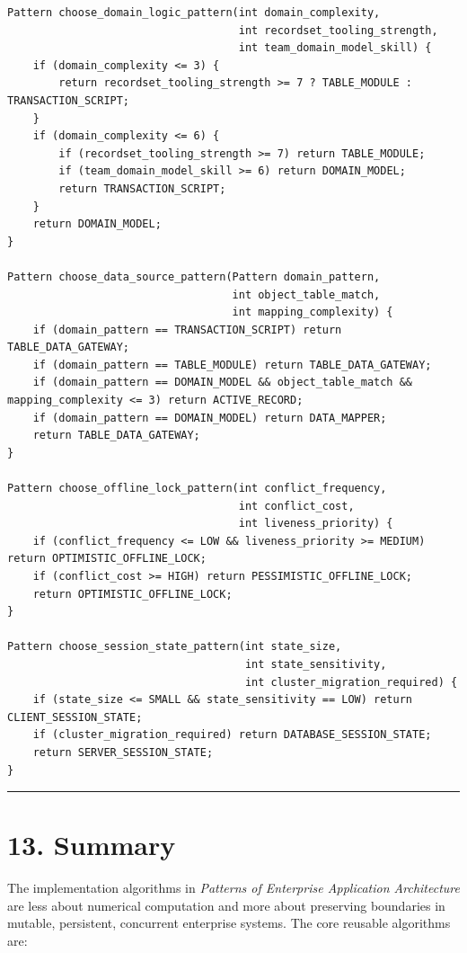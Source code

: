 \documentclass[11pt]{article}
\begin{document}
\begin{verbatim}
Pattern choose_domain_logic_pattern(int domain_complexity,
                                    int recordset_tooling_strength,
                                    int team_domain_model_skill) {
    if (domain_complexity <= 3) {
        return recordset_tooling_strength >= 7 ? TABLE_MODULE : TRANSACTION_SCRIPT;
    }
    if (domain_complexity <= 6) {
        if (recordset_tooling_strength >= 7) return TABLE_MODULE;
        if (team_domain_model_skill >= 6) return DOMAIN_MODEL;
        return TRANSACTION_SCRIPT;
    }
    return DOMAIN_MODEL;
}

Pattern choose_data_source_pattern(Pattern domain_pattern,
                                   int object_table_match,
                                   int mapping_complexity) {
    if (domain_pattern == TRANSACTION_SCRIPT) return TABLE_DATA_GATEWAY;
    if (domain_pattern == TABLE_MODULE) return TABLE_DATA_GATEWAY;
    if (domain_pattern == DOMAIN_MODEL && object_table_match && mapping_complexity <= 3) return ACTIVE_RECORD;
    if (domain_pattern == DOMAIN_MODEL) return DATA_MAPPER;
    return TABLE_DATA_GATEWAY;
}

Pattern choose_offline_lock_pattern(int conflict_frequency,
                                    int conflict_cost,
                                    int liveness_priority) {
    if (conflict_frequency <= LOW && liveness_priority >= MEDIUM) return OPTIMISTIC_OFFLINE_LOCK;
    if (conflict_cost >= HIGH) return PESSIMISTIC_OFFLINE_LOCK;
    return OPTIMISTIC_OFFLINE_LOCK;
}

Pattern choose_session_state_pattern(int state_size,
                                     int state_sensitivity,
                                     int cluster_migration_required) {
    if (state_size <= SMALL && state_sensitivity == LOW) return CLIENT_SESSION_STATE;
    if (cluster_migration_required) return DATABASE_SESSION_STATE;
    return SERVER_SESSION_STATE;
}
\end{verbatim}

\begin{center}\rule{0.5\linewidth}{0.5pt}\end{center}

\section{13. Summary}\label{summary}

The implementation algorithms in \emph{Patterns of Enterprise
Application Architecture} are less about numerical computation and more
about preserving boundaries in mutable, persistent, concurrent
enterprise systems. The core reusable algorithms are:
\end{document}
